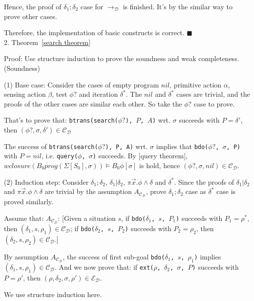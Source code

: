 \documentclass[letterpaper]{article}
\begin{document}
Hence, the proof of $\delta_1;\delta_2$ case for $\rightarrow_\mathcal{D}$ is finished. It's by the similar way to prove other cases.

Therefore, the implementation of basic constructs is correct.
$\blacksquare$
\\

2. Theorem~\ref{search theorem}

Proof: Use structure induction to prove the soundness and weak completeness.
\\

(Soundness)

(1) Base case: Consider the cases of empty program $nil$, primitive action $\alpha$, sensing action $\beta$, test $\phi?$ and iteration $\delta^*$. The $nil$ and $\delta^*$ cases are trivial, and the proofs of the other cases are similar each other. So take the $\phi?$ case to prove.

That's to prove that:
\texttt{btrans(search($\phi?$), $P$, $A$)} wrt. $\sigma$ succeeds with $P = \delta'$, then $(\phi?, \sigma, \delta') \in \mathcal{C_D}$

The success of \texttt{btrans(search($\phi?$), P, A)} wrt. $\sigma$ implies that \texttt{bdo($\phi?$, $\sigma$, P)} with $P=nil$, i.e. \texttt{query($\phi$, $\sigma$)} succeeds. By [query theorem], $wclosure(B_0 prog(\Sigma[S_0], \sigma))\models B_0 \phi[\sigma]$ is hold, hence $(\phi?,\sigma,nil)\in\mathcal{C_D}$.

(2) Induction step:
Consider $\delta_1;\delta_2$, $\delta_1|\delta_2$, $\pi\vec{x}.\phi\wedge\delta$ and $\delta^*$. Since the proofs of $\delta_1|\delta_2$ and $\pi\vec{x}.\phi\wedge\delta$ are trivial by the assumption $A_\mathcal{C_D}$, prove $\delta_1;\delta_2$ case as $\delta^*$ case is proved similarly.

Assume that: $A_\mathcal{C_D}$: [Given a situation $s$, if \texttt{bdo($\delta_1$, $s$, $P_1$)} succeeds with $P_1=\rho^*$, then $(\delta_1, s, \rho_1)\in \mathcal{C_D}$; if \texttt{bdo($\delta_2$, $s$, $P_2$)} succeeds with $P_2=\rho_2$, then $(\delta_2, s, \rho_2)\in \mathcal{C_D}$.]

By assumption $A_\mathcal{C_D}$, the success of first sub-goal \texttt{bdo($\delta_1$, $s$, $\rho_1$)} implies $(\delta_1, s, \rho_1)\in \mathcal{C_D}$. And we now prove that: if \texttt{ext($\rho$, $\delta_2$, $\sigma$, $P$)} succeeds with $P=\rho'$, then $(\rho, \delta_2, \sigma, \rho')\in \mathcal{E_D}$.

We use structure induction here.
\end{document}
